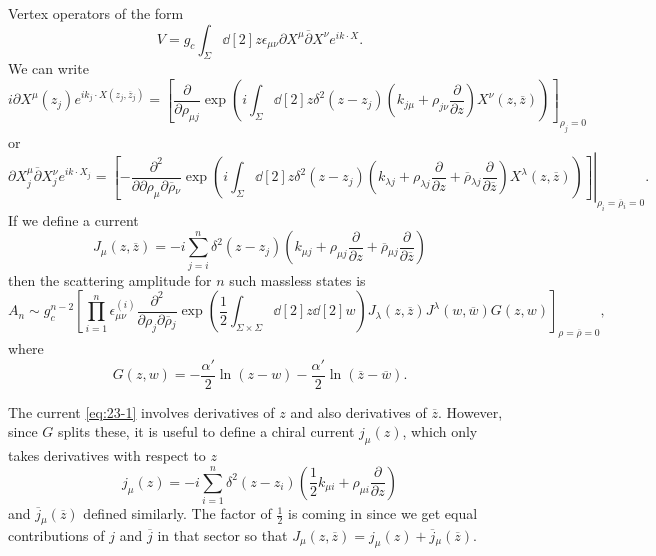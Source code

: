 Vertex operators of the form
\begin{equation}
  V = g_c \int_{\Sigma} \dd[2]{z} \epsilon_{\mu\nu} \partial X^{\mu} \overline{\partial}{} X^{\nu} e^{i k \cdot X}.
\end{equation}
We can write
\begin{equation}
  i \partial X^{\mu} (z_{j}) e^{i k_{j} \cdot X(z_j, \overline{z}{}_j)} = \left[ \frac{\partial }{\partial \rho_{\mu j}} \exp(i \int_{\Sigma} \dd[2]{z} \delta^2(z - z_j) (k_{j \mu} + \rho_{j \nu} \frac{\partial }{\partial z}) X^{\nu}(z, \overline{z}{})) \right]_{\rho_j = 0}
\end{equation}
or
\begin{equation}
  \partial X^{\mu}_j \overline{\partial}{}X^{\nu}_j e^{i k \cdot X_j} = \left.\left[ -\frac{\partial^2}{\partial \partial \rho_\mu \partial \overline{\rho}{}_{\nu}} \exp(i \int_{\Sigma} \dd[2]{z} \delta^2 (z - z_j) \left( k_{\lambda j} + \rho_{\lambda j} \frac{\partial }{\partial z} + \overline{\rho}{}_{\lambda j} \frac{\partial }{\partial \overline{z}{}} \right) X^{\lambda}(z, \overline{z}{})) \right]\right\rvert_{\rho_i = \overline{\rho}{}_i = 0}.
\end{equation}
If we define a current
\begin{equation}
  \label{eq:23-1}
  J_{\mu} (z, \overline{z}{}) = -i \sum_{j=i}^{n} \delta^2 (z - z_j) \left( k_{\mu j} + \rho_{\mu j} \frac{\partial }{\partial z} + \overline{\rho}{}_{\mu j} \frac{\partial }{\partial \overline{z}{}} \right)
\end{equation}
then the scattering amplitude for $n$ such massless states is
\begin{equation}
  A_n \sim g^{n-2}_c \left[ \prod_{i=1}^{n} \epsilon^{(i)}_{\mu \nu} \frac{\partial^2}{\partial \rho_j \partial\overline{\rho}{}_j} \exp(\frac{1}{2} \int_{\Sigma \times \Sigma} \dd[2]{z} \dd[2]{w}) J_{\lambda}(z, \overline{z}{}) J^{\lambda}(w, \overline{w}{}) G(z, w) \right]_{\rho = \overline{\rho} = 0},
 \end{equation}
where 
\begin{equation}
  G(z, w) = -\frac{\alpha'}{2} \ln(z - w) - \frac{\alpha'}{2} \ln(\overline{z}{} - \overline{w}{}).
\end{equation}

The current \eqref{eq:23-1} involves derivatives of $z$ and also derivatives of $\overline{z}{}$.
However, since $G$ splits these, it is useful to define a chiral current $j_{\mu}(z)$, which only takes derivatives with respect to $z$
\begin{equation}
  j_{\mu}(z) = -i \sum_{i=1}^{n} \delta^2 (z - z_i) \left( \frac{1}{2} k_{\mu i} + \rho_{\mu i} \frac{\partial }{\partial z} \right)
\end{equation}
and $\overline{j}{}_{\mu}(\overline{z}{})$ defined similarly.
The factor of $\frac{1}{2}$ is coming in since we get equal contributions of $j$ and $\overline{j}{}$ in that sector so that $J_{\mu}(z, \overline{z}{}) = j_{\mu}(z) + \overline{j}{}_{\mu}(\overline{z}{})$.

